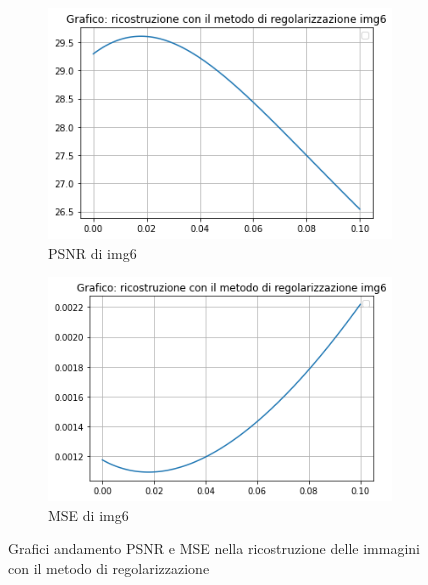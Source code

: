 \begin{figure}[H]
    \begin{subfigure}{0.5\textwidth}
        \centering
        \includegraphics[width=\textwidth]{output/PSNR/outputPSNR-img6.png}
        \caption{PSNR di img6}
        \label{fig:img6PSNR}
    \end{subfigure}\hfill
    \begin{subfigure}{0.5\textwidth}
        \centering
        \includegraphics[width=\textwidth]{output/MSE/outputMSE-img6.png}
        \caption{MSE di img6}
        \label{fig:img6MSE}
    \end{subfigure}
    \caption{Grafici andamento PSNR e MSE nella ricostruzione delle immagini con il metodo di regolarizzazione}
\end{figure}%
